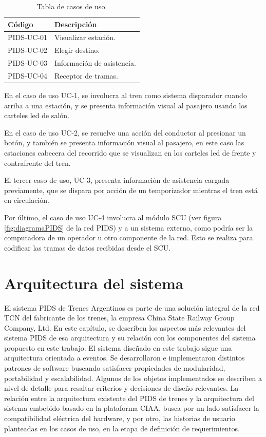 \begin{table}[htb]
\caption{Tabla de casos de uso.}
\label{tab:UseCases}
\begin{center}
\begin{tabular}{ll}
\toprule
\textbf{Código} & \textbf{Descripción}     \\ 
\midrule
PIDS-UC-01  & Visualizar estación.         \\ \hline
PIDS-UC-02  & Elegir destino.             \\ \hline
PIDS-UC-03  & Información de asistencia. \\ \hline
PIDS-UC-04  & Receptor de tramas.       \\ 
\bottomrule
\end{tabular}
\end{center}
\end{table}

En el caso de uso UC-1, se involucra al tren como sistema disparador cuando arriba a una estación, y se presenta información visual al pasajero usando los carteles led de salón. 

En el caso de uso UC-2, se resuelve una acción del conductor al presionar un botón, y también se presenta información visual al pasajero, en este caso las estaciones cabecera del recorrido que se visualizan en los carteles led de frente y contrafrente del tren. 

El tercer caso de uso, UC-3, presenta información de asistencia cargada previamente, que se dispara por acción de un temporizador mientras el tren está en circulación. 

Por último, el caso de uso UC-4 involucra al módulo SCU (ver figura  \ref{fig:diagramaPIDS} de la red PIDS) y a un sistema externo, como podría ser la computadora de un operador u otro componente de la red. Esto se realiza para codificar las tramas de datos recibidas desde el SCU.\\

\section{Arquitectura del sistema}

El sistema PIDS de Trenes Argentinos es parte de una solución integral de la red TCN del fabricante de los trenes, la empresa China State Railway Group Company, Ltd. En este capítulo, se describen los aspectos más relevantes del sistema PIDS de esa arquitectura y su relación con los componentes del sistema propuesto en este trabajo. El sistema diseñado en este trabajo sigue una arquitectura orientada a eventos. Se desarrollaron e implementaron distintos patrones de software buscando satisfacer propiedades de modularidad, portabilidad y escalabilidad. Algunos de los objetos implementados se describen a nivel de detalle para resaltar criterios y decisiones de diseño relevantes. La relación entre la arquitectura existente del PIDS de trenes y la arquitectura del sistema embebido basado en la plataforma CIAA, busca por un lado satisfacer la compatibilidad eléctrica del hardware, y por otro, las historias de usuario planteadas en los casos de uso, en la etapa de definición de requerimientos. \\

